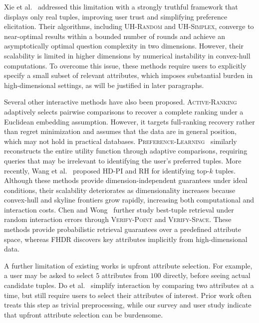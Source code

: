 Xie et al.~\cite{XCL19} addressed this limitation with a strongly truthful framework that displays only real tuples, improving user trust and simplifying preference elicitation. Their algorithms, including \textsc{UH-Random} and \textsc{UH-Simplex}, converge to near-optimal results within a bounded number of rounds and achieve an asymptotically optimal question complexity in two dimensions. However, their scalability is limited in higher dimensions by numerical instability in convex-hull computations. To overcome this issue, these methods require users to explicitly specify a small subset of relevant attributes, which imposes substantial burden in high-dimensional settings, as will be justified in later paragraphs.

Several other interactive methods have also been proposed. \textsc{Active-Ranking}~\cite{jamieson2011active} adaptively selects pairwise comparisons to recover a complete ranking under a Euclidean embedding assumption. However, it targets full-ranking recovery rather than regret minimization and assumes that the data are in general position, which may not hold in practical databases. \textsc{Preference-Learning}~\cite{qian2015learning} similarly reconstructs the entire utility function through adaptive comparisons, requiring queries that may be irrelevant to identifying the user’s preferred tuples. More recently, Wang et al.~\cite{WWX21} proposed \textsc{HD-PI} and \textsc{RH} for identifying top-$k$ tuples. Although these methods provide dimension-independent guarantees under ideal conditions, their scalability deteriorates as dimensionality increases because convex-hull and skyline frontiers grow rapidly, increasing both computational and interaction costs. Chen and Wong~\cite{CW23} further study best-tuple retrieval under random interaction errors through \textsc{Verify-Point} and \textsc{Verify-Space}. These methods provide probabilistic retrieval guarantees over a predefined attribute space, whereas FHDR discovers key attributes implicitly from high-dimensional data.

A further limitation of existing works is upfront attribute selection. For example, a user may be asked to select $5$ attributes from $100$ directly, before seeing actual candidate tuples. Do et al.~\cite{LA25} simplify interaction by comparing two attributes at a time, but still require users to select their attributes of interest. Prior work often treats this step as trivial preprocessing, while our survey and user study indicate that upfront attribute selection can be burdensome.

